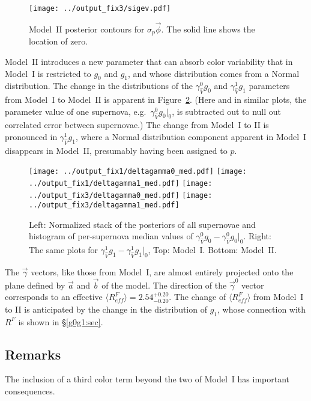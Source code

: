 \documentclass[trackchanges]{aastex61}   	%
\begin{document}
{\begin{figure}[htbp] %
   \centering
   \texttt{[image: ../output\_fix3/sigev.pdf]} 
            \caption{Model~II posterior  contours for $\sigma_p \vec{\phi}$. 
            The solid line shows the location of zero.          \label{M1ev:fig}}
\end{figure}

Model~II introduces a new parameter  that can absorb color variability
that in Model~I is restricted to $g_0$ and $g_1$, and whose distribution comes from a Normal distribution.
The change in the distributions of the $\gamma^0_{\hat{V}} g_0$ and $\gamma^1_{\hat{V}}g_1$ parameters from
 Model~I to Model~II
is apparent in Figure~\ref{kcomp:fig}.  (Here and in similar plots, the parameter value of one supernova,
e.g.\ $\gamma^0_{\hat{V}} g_0|_0$, is subtracted
out to null out correlated error between supernovae.) The  change from Model~I to II is pronounced in  $\gamma^1_{\hat{V}}g_1$,
where  a Normal distribution component apparent in Model~I disappears in Model~II, presumably having been  assigned to $p$.


\begin{figure}[htbp] %
   \centering
   \texttt{[image: ../output\_fix1/deltagamma0\_med.pdf]} 
   \texttt{[image: ../output\_fix1/deltagamma1\_med.pdf]} 
   \texttt{[image: ../output\_fix3/deltagamma0\_med.pdf]} 
   \texttt{[image: ../output\_fix3/deltagamma1\_med.pdf]} 
   \caption{
   Left:
   Normalized stack of the posteriors of all supernovae  and histogram 
      of  per-supernova 
median values of $\gamma^0_{\hat{V}} g_0-\gamma^0_{\hat{V}} g_0|_0$.  Right:  The same plots for $\gamma^1_{\hat{V}} g_1-\gamma^1_{\hat{V}} g_1|_0$,
Top: Model~I. Bottom: Model~II.
    \label{kcomp:fig}}
\end{figure}

The $\vec{\gamma}$ vectors, like those from Model~I, are almost entirely projected
onto the plane defined by
$\vec{a}$ and $\vec{b}$ of the  model.
The direction of the  $\vec{\gamma}^0$ vector corresponds to an effective $\langle R^F_{\mathit{eff}}\rangle = 2.54^{+0.20}_{-0.20}$.
The change of $\langle R^F_{\mathit{eff}}\rangle$ from Model~I to II is anticipated by the change in the distribution of $g_1$,
whose connection with $R^F$ is shown in \S\ref{g0g1:sec}.


\subsection{Remarks}
The inclusion of a third color term beyond the two of Model~I has important consequences.

}
\end{document}
